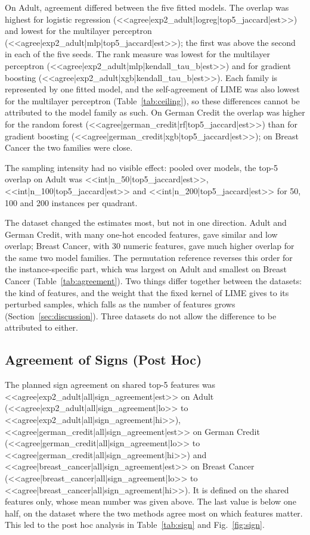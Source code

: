 \documentclass{cys}
\begin{document}
On Adult, agreement differed between the five fitted models. The overlap was highest for
logistic regression (<<agree|exp2_adult|logreg|top5_jaccard|est>>) and lowest for the
multilayer perceptron (<<agree|exp2_adult|mlp|top5_jaccard|est>>); the first was above
the second in each of the five seeds. The rank measure was lowest for the multilayer perceptron
(<<agree|exp2_adult|mlp|kendall_tau_b|est>>) and for gradient boosting
(<<agree|exp2_adult|xgb|kendall_tau_b|est>>). Each family is represented by one fitted
model, and the self-agreement of LIME was also lowest for the multilayer perceptron
(Table~\ref{tab:ceiling}), so these differences cannot be attributed to the model family
as such. On German Credit the overlap was higher for the random forest
(<<agree|german_credit|rf|top5_jaccard|est>>) than for gradient boosting
(<<agree|german_credit|xgb|top5_jaccard|est>>); on Breast Cancer the two families were
close.

The sampling intensity had no visible effect: pooled over models, the top-5 overlap on
Adult was <<int|n_50|top5_jaccard|est>>, <<int|n_100|top5_jaccard|est>> and
<<int|n_200|top5_jaccard|est>> for 50, 100 and 200 instances per quadrant. 

The dataset changed the estimates most, but not in one direction. Adult and German
Credit, with many one-hot encoded features, gave similar and low overlap; Breast Cancer,
with 30 numeric features, gave much higher overlap for the same two model families. The
permutation reference reverses this order for the instance-specific part, which was
largest on Adult and smallest on Breast Cancer (Table~\ref{tab:agreement}). Two things
differ together between the datasets: the kind of features, and the weight that the fixed
kernel of LIME gives to its perturbed samples, which falls as the number of features grows
(Section~\ref{sec:discussion}). Three datasets do not allow the difference to be
attributed to either.

\subsection{Agreement of Signs (Post Hoc)}
\label{sec:results:sign}

The planned sign agreement on shared top-5 features was
<<agree|exp2_adult|all|sign_agreement|est>> on Adult
(<<agree|exp2_adult|all|sign_agreement|lo>> to <<agree|exp2_adult|all|sign_agreement|hi>>),
<<agree|german_credit|all|sign_agreement|est>> on German Credit
(<<agree|german_credit|all|sign_agreement|lo>> to
<<agree|german_credit|all|sign_agreement|hi>>) and
<<agree|breast_cancer|all|sign_agreement|est>> on Breast Cancer
(<<agree|breast_cancer|all|sign_agreement|lo>> to
<<agree|breast_cancer|all|sign_agreement|hi>>). It is defined on the shared features
only, whose mean number was given above. The last value is below
one half, on the dataset where the two methods agree most on which features matter. This
led to the post hoc analysis in Table~\ref{tab:sign} and Fig.~\ref{fig:sign}.
\end{document}
